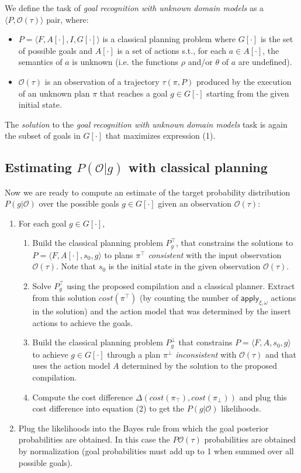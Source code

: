 \documentclass{article}
\newcommand{\tup}[1]{{\langle #1 \rangle}}
\begin{document}
We define the task of {\em goal recognition with unknown domain models} as a $\tup{P,\mathcal{O}(\tau)}$ pair, where:
\begin{itemize}
\item $P=\tup{F,A[\cdot],I,G[\cdot]}$ is a classical planning problem where $G[\cdot]$ is the set of possible goals and $A[\cdot]$ is a set of actions s.t., for each $a\in A[\cdot]$, the semantics of $a$ is unknown (i.e. the functions $\rho$ and/or $\theta$ of $a$ are undefined).
\item $\mathcal{O}(\tau)$ is an observation of a trajectory $\tau(\pi,P)$ produced by the execution of an unknown plan $\pi$ that reaches a goal $g\in G[\cdot]$ starting from the given initial state.
\end{itemize}

The {\em solution} to the {\em goal recognition with unknown domain models} task is again the subset of goals in $G[\cdot]$ that maximizes expression (1). 

\subsection{Estimating $P(\mathcal{O}|g)$ with classical planning}
Now we are ready to compute an estimate of the target probability distribution $P(g|\mathcal{O})$ over the possible goals $g\in G[\cdot]$ given an observation $\mathcal{O}(\tau)$:
\begin{enumerate}
\item For each goal $g\in G[\cdot]$,
\begin{enumerate}
\item Build the classical planning problem $P^{\top}_g$, that constrains the solutions to $P=\tup{F,A[\cdot],s_0,g}$ to plans $\pi^\top$ {\em consistent} with the input observation $\mathcal{O}(\tau)$. Note that $s_0$ is the initial state in the given observation $\mathcal{O}(\tau)$.
\item Solve $P^{\top}_g$ using the proposed compilation and a classical planner. Extract from this solution $cost(\pi^\top)$ (by counting the number of $\mathsf{apply_{\xi,\omega}}$ actions in the solution) and the action model that was determined by the insert actions to achieve the goals.
\item Build the classical planning problem $P^{\bot}_g$ that constrains $P=\tup{F,A,s_0,g}$ to achieve $g\in G[\cdot]$ through a plan $\pi^\bot$ {\em inconsistent} with $\mathcal{O}(\tau)$ and that uses the action model $A$ determined by the solution to the proposed compilation.
\item Compute the cost difference $\Delta(cost(\pi_\top),cost(\pi_\bot))$ and plug this cost difference into equation (2) to get the $P(g|\mathcal{O})$ likelihoods.
\end{enumerate}
\item Plug the likelihoods into the Bayes rule from which the goal posterior probabilities are obtained. In this case the $P\mathcal{O}(\tau)$ probabilities are obtained by normalization (goal probabilities must add up to 1 when summed over all possible goals).
\end{enumerate}
\end{document}
